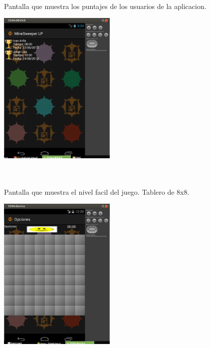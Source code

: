 \documentclass[../documentacion_buscaminas2013.tex]{subfiles}
\begin{document}
\begin{figure}[!ht]
\paragraph{ } Pantalla que muestra los puntajes de los usuarios de la aplicacion.
\newline
	~\newline
	\begin{center}
		\includegraphics[width=0.5\textwidth]{./images/ranking.png}
	\end{center}

~\newline
\paragraph{ } Pantalla que muestra el nivel facil del juego. Tablero de 8x8.
\newline
	~\newline
	\begin{center}
		\includegraphics[width=0.5\textwidth]{./images/facil.png}
	\end{center}

\end{figure}
\end{document}
